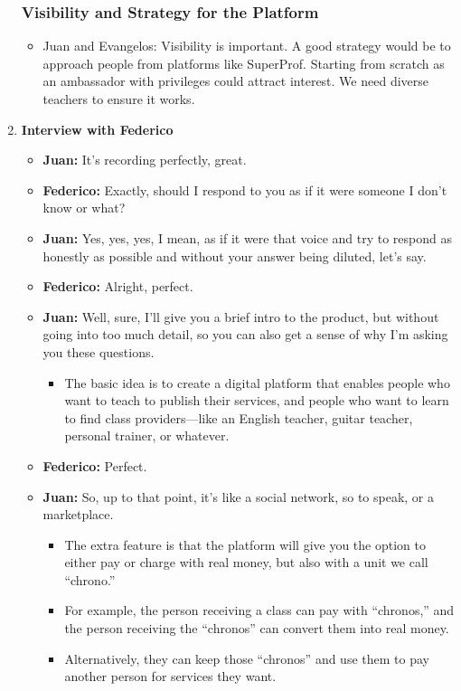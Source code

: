 \begin{enumerate}
    \subsubsection*{Visibility and Strategy for the Platform}
    \begin{itemize}
        \item Juan and Evangelos: Visibility is important.
        A good strategy would be to approach people from platforms like SuperProf.
        Starting from scratch as an ambassador with privileges could attract interest.
        We need diverse teachers to ensure it works.
    \end{itemize}

    \item \textbf{Interview with Federico}
    \begin{itemize}

        \item \textbf{Juan:} It's recording perfectly, great.
        \item \textbf{Federico:} Exactly, should I respond to you as if it were someone I don't know or what?
        \item \textbf{Juan:} Yes, yes, yes, I mean, as if it were that voice and try to respond as honestly as possible and without your answer being diluted, let's say.
        \item \textbf{Federico:} Alright, perfect.

        \item \textbf{Juan:} Well, sure, I'll give you a brief intro to the product, but without going into too much detail, so you can also get a sense of why I'm asking you these questions.
        \begin{itemize}
            \item The basic idea is to create a digital platform that enables people who want to teach to publish their services, and people who want to learn to find class providers—like an English teacher, guitar teacher, personal trainer, or whatever.
        \end{itemize}

        \item \textbf{Federico:} Perfect.

        \item \textbf{Juan:} So, up to that point, it's like a social network, so to speak, or a marketplace.
        \begin{itemize}
            \item The extra feature is that the platform will give you the option to either pay or charge with real money, but also with a unit we call ``chrono.''
            \item For example, the person receiving a class can pay with ``chronos,'' and the person receiving the ``chronos'' can convert them into real money.
            \item Alternatively, they can keep those ``chronos'' and use them to pay another person for services they want.
        \end{itemize}


\end{itemize}
\end{enumerate}
